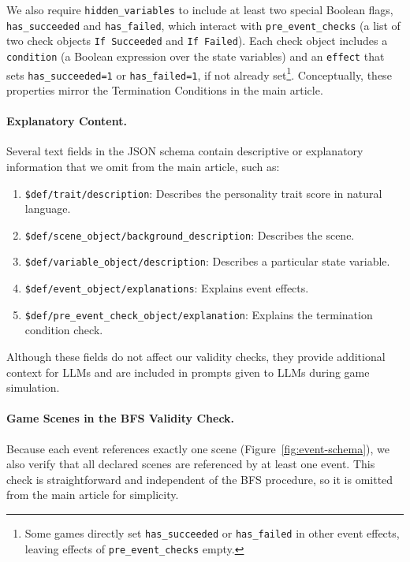 We also require \texttt{hidden\_variables} to include at least two special Boolean flags, \texttt{has\_succeeded} and \texttt{has\_failed}, which interact with \texttt{pre\_event\_checks} (a list of two check objects \texttt{If Succeeded} and \texttt{If Failed}). Each check object includes a \texttt{condition} (a Boolean expression over the state variables) and an \texttt{effect} that sets \texttt{has\_succeeded=1} or \texttt{has\_failed=1}, if not already set\footnote{Some games directly set \texttt{has\_succeeded} or \texttt{has\_failed} in other event effects, leaving effects of \texttt{pre\_event\_checks} empty.}. Conceptually, these properties mirror the Termination Conditions in the main article.

\paragraph{Explanatory Content.}
Several text fields in the JSON schema contain descriptive or explanatory information that we omit from the main article, such as:
\begin{enumerate}
    \item \texttt{\$def/trait/description}: Describes the personality trait score in natural language.
    \item \texttt{\$def/scene\_object/background\_description}: Describes the scene.
    \item \texttt{\$def/variable\_object/description}: Describes a particular state variable.
    \item \texttt{\$def/event\_object/explanations}: Explains event effects.
    \item \texttt{\$def/pre\_event\_check\_object/explanation}: Explains the termination condition check.
\end{enumerate}
Although these fields do not affect our validity checks, they provide additional context for LLMs and are included in prompts given to LLMs during game simulation.

\paragraph{Game Scenes in the BFS Validity Check.}
Because each event references exactly one scene (Figure~\ref{fig:event-schema}), we also verify that all declared scenes are referenced by at least one event. This check is straightforward and independent of the BFS procedure, so it is omitted from the main article for simplicity.

